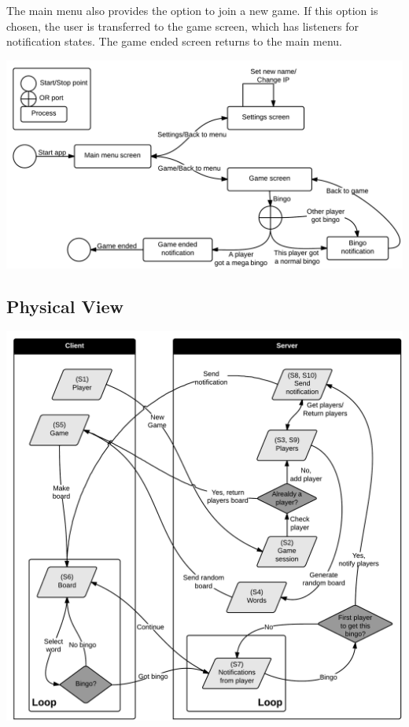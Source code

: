 The main menu also provides the option to join a new game. If this option is
chosen, the user is transferred to the game screen, which has listeners for
notification states. The game ended screen returns to the main menu.
\begin{center}
\includegraphics[clip=true, width=0.9 \textwidth]{Pikks/ProcessViewFinal.png}
\label{ref:gantt}
\end{center}

\subsection{Physical View}
\begin{center}
\includegraphics[clip=true, width=0.9 \textwidth]{Pikks/PhysicalViewFinal}
\end{center}

